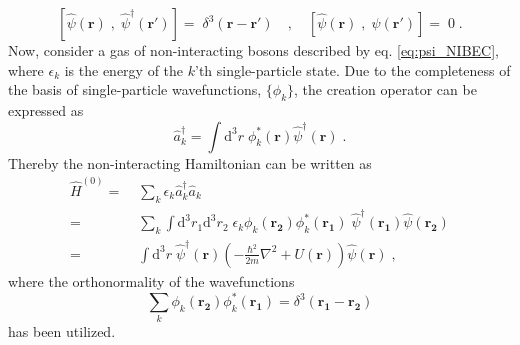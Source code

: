 \begin{equation}
	\left[ \hat{\psi}(\boldsymbol{r}) \; , \; \hat{\psi}^{\dag}(\boldsymbol{r'}) \right] = \; \delta^3(\boldsymbol{r} - \boldsymbol{r}') \quad , \quad
	\left[ \hat{\psi}(\boldsymbol{r}) \; , \; \hat{\psi}(\boldsymbol{r'}) \right] = \; 0 \; .
\end{equation}
Now, consider a gas of non-interacting bosons described by eq. \eqref{eq:psi_NIBEC}, where $\epsilon_k$ is the energy of the $k$'th single-particle state. Due to the completeness of the basis of single-particle wavefunctions, $\{ \phi_k \}$, the creation operator can be expressed as
\begin{equation}
	\hat{a}_{k}^{\dagger} = \int \mathrm{d^3} r \;  \phi_{k}^*(\boldsymbol{r}) \hat{\psi}^{\dagger}(\boldsymbol{r}) \; .
\end{equation}
Thereby the non-interacting Hamiltonian can be written as
\begin{align}
	\hat{H}^{(0)} =& \; \sum_{k} \epsilon_k \hat{a}_{k}^{\dag} \hat{a}_{k} \nonumber \\
		=& \;  \sum_{k} \int \mathrm{d^3}r_1 \mathrm{d^3}r_2 \; \epsilon_k \phi_k (\boldsymbol{r_2}) \phi_{k}^* (\boldsymbol{r_1})\;  \hat{\psi}^{\dag} (\boldsymbol{r_1}) \hat{\psi} (\boldsymbol{r_2}) \nonumber \\
		=& \; \int \mathrm{d^3}r  \; \hat{\psi}^{\dag}(\boldsymbol{r}) \left( - \frac{\hbar^2}{2 m} \nabla^2 + U(\boldsymbol{r})\right) \hat{\psi}(\boldsymbol{r}) \; ,
		\label{hamil2nd}
\end{align}
where the orthonormality of the wavefunctions
\begin{equation}
	\sum_{k}  \phi_k (\boldsymbol{r_2}) \phi_{k}^* (\boldsymbol{r_1}) = \delta^3(\boldsymbol{r_1} - \boldsymbol{r_2})
\end{equation} 
has been utilized.


